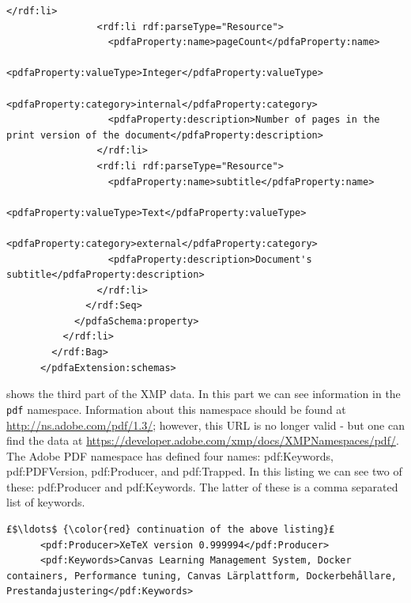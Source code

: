 \begin{lstlisting}[style=myXML,
caption={Second part of the XML metadata embedded in a PDF file (some reformatting has been done to fit the text in the boarders)}, label={lst:pdfinfoOutputPart2}]
                </rdf:li>
                <rdf:li rdf:parseType="Resource">
                  <pdfaProperty:name>pageCount</pdfaProperty:name>
                  <pdfaProperty:valueType>Integer</pdfaProperty:valueType>
                  <pdfaProperty:category>internal</pdfaProperty:category>
                  <pdfaProperty:description>Number of pages in the print version of the document</pdfaProperty:description>
                </rdf:li>
                <rdf:li rdf:parseType="Resource">
                  <pdfaProperty:name>subtitle</pdfaProperty:name>
                  <pdfaProperty:valueType>Text</pdfaProperty:valueType>
                  <pdfaProperty:category>external</pdfaProperty:category>
                  <pdfaProperty:description>Document's subtitle</pdfaProperty:description>
                </rdf:li>
              </rdf:Seq>
            </pdfaSchema:property>
          </rdf:li>
        </rdf:Bag>
      </pdfaExtension:schemas>
\end{lstlisting}

 shows the third part of the XMP data. In this part we can see information in the \texttt{pdf} namespace. Information about this namespace should be found at \url{http://ns.adobe.com/pdf/1.3/}; however, this URL is no longer valid - but one can find the data at \url{https://developer.adobe.com/xmp/docs/XMPNamespaces/pdf/}. The Adobe PDF namespace has defined four names: pdf:Keywords, pdf:PDFVersion, pdf:Producer, and pdf:Trapped. In this listing we can see two of these: pdf:Producer and pdf:Keywords. The latter of these is a comma separated list of keywords.
\begin{lstlisting}[style=myXML,
caption={The \texttt{pdf}-prefix metadata embedded in a PDF file (some reformatting has been done to fit the text in the boarders)}, label={lst:pdfinfoOutputPart3}]
£$\ldots$ {\color{red} continuation of the above listing}£ 
      <pdf:Producer>XeTeX version 0.999994</pdf:Producer>
      <pdf:Keywords>Canvas Learning Management System, Docker containers, Performance tuning, Canvas Lärplattform, Dockerbehållare, Prestandajustering</pdf:Keywords>
\end{lstlisting}

